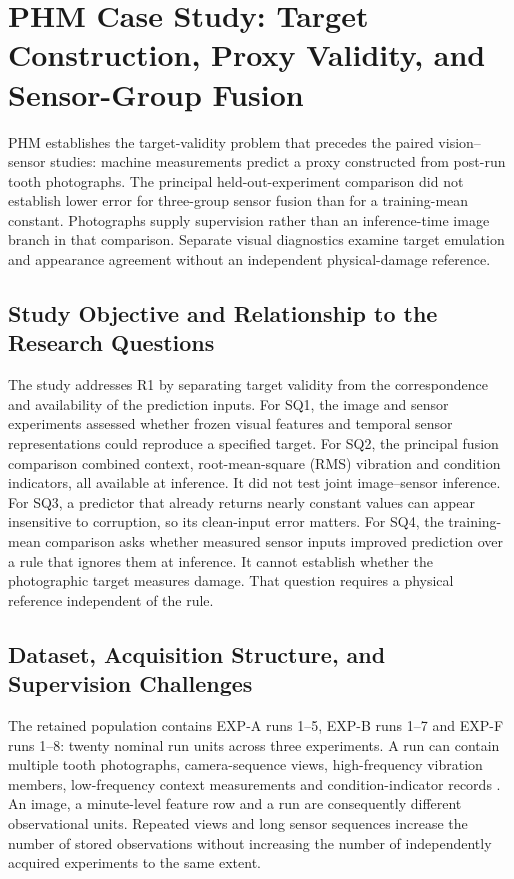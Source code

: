 \chapter{PHM Case Study: Target Construction, Proxy Validity, and Sensor-Group Fusion}
\label{ch:phm}
PHM establishes the target-validity problem that precedes the paired vision--sensor
studies: machine measurements predict a proxy constructed from post-run tooth
photographs. The principal held-out-experiment comparison did not establish lower error
for three-group sensor fusion than for a training-mean constant. Photographs supply
supervision rather than an inference-time image branch in that comparison. Separate
visual diagnostics examine target emulation and appearance agreement without an
independent physical-damage reference.

\section{Study Objective and Relationship to the Research Questions}
The study addresses R1 by separating target validity from the correspondence and
availability of the prediction inputs. For SQ1, the image and sensor experiments assessed whether frozen visual features and
temporal sensor representations could reproduce a specified target. For SQ2, the
principal fusion comparison combined context, root-mean-square (RMS) vibration and
condition indicators, all available at inference. It did not test joint image--sensor
inference. For SQ3, a predictor that already returns nearly constant values can appear
insensitive to corruption, so its clean-input error matters. For SQ4, the training-mean
comparison asks whether measured sensor inputs improved prediction over a rule that
ignores them at inference. It cannot establish whether the photographic target measures
damage. That question requires a physical reference independent of the rule.

\section{Dataset, Acquisition Structure, and Supervision Challenges}
The retained population contains EXP-A runs 1--5, EXP-B runs 1--7 and EXP-F runs 1--8:
twenty nominal run units across three experiments. A run can contain multiple tooth
photographs, camera-sequence views, high-frequency vibration members, low-frequency
context measurements and condition-indicator records \parencite{PHM2026Challenge}.
An image, a minute-level feature
row and a run are consequently different observational units. Repeated views and long
sensor sequences increase the number of stored observations without increasing the
number of independently acquired experiments to the same extent.

